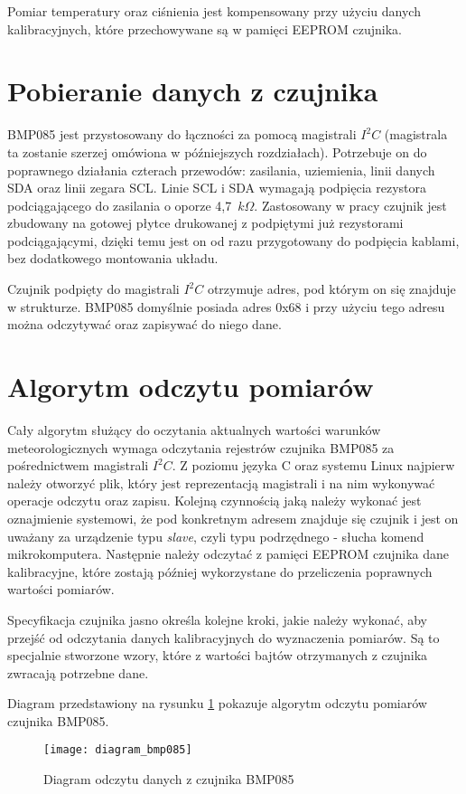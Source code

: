 Pomiar temperatury oraz ciśnienia jest kompensowany przy użyciu danych kalibracyjnych, które przechowywane są w pamięci EEPROM czujnika.

\section*{Pobieranie danych z czujnika}
BMP085 jest przystosowany do łączności za pomocą magistrali $I^2C$ (magistrala ta zostanie szerzej omówiona w późniejszych rozdziałach). Potrzebuje on do poprawnego działania czterach przewodów: zasilania, uziemienia, linii danych SDA oraz linii zegara SCL. Linie SCL i SDA wymagają podpięcia rezystora podciągającego do zasilania o oporze 4,7~$k\Omega$. Zastosowany w pracy czujnik jest zbudowany na gotowej płytce drukowanej z podpiętymi już rezystorami podciągającymi, dzięki temu jest on od razu przygotowany do podpięcia kablami, bez dodatkowego montowania układu.

Czujnik podpięty do magistrali $I^2C$ otrzymuje adres, pod którym on się znajduje w strukturze. BMP085 domyślnie posiada adres 0x68 i przy użyciu tego adresu można odczytywać oraz zapisywać do niego dane.

\section*{Algorytm odczytu pomiarów}
Cały algorytm służący do oczytania aktualnych wartości warunków meteorologicznych wymaga odczytania rejestrów czujnika BMP085 za pośrednictwem magistrali $I^2C$. Z poziomu języka C oraz systemu Linux najpierw należy otworzyć plik, który jest reprezentacją magistrali i na nim wykonywać operacje odczytu oraz zapisu. Kolejną czynnością jaką należy wykonać jest oznajmienie systemowi, że pod konkretnym adresem znajduje się czujnik i jest on uważany za urządzenie typu \emph{slave}, czyli typu podrzędnego - słucha komend mikrokomputera. Następnie należy odczytać z pamięci EEPROM czujnika dane kalibracyjne, które zostają później wykorzystane do przeliczenia poprawnych wartości pomiarów.

Specyfikacja czujnika jasno określa kolejne kroki, jakie należy wykonać, aby przejść od odczytania danych kalibracyjnych do wyznaczenia pomiarów. Są to specjalnie stworzone wzory, które z wartości bajtów otrzymanych z czujnika zwracają potrzebne dane.

Diagram przedstawiony na rysunku \ref{fig:diagram_bmp085} pokazuje algorytm odczytu pomiarów czujnika BMP085.

\begin{figure}[h]
\centering
\texttt{[image: diagram\_bmp085]}
\caption{Diagram odczytu danych z czujnika BMP085}
\label{fig:diagram_bmp085}
\end{figure}